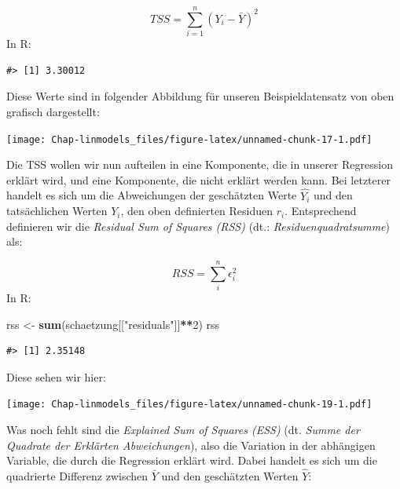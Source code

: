 \documentclass[]{book}
\newenvironment{Shaded}{\begin{snugshade}}{\end{snugshade}}
\newcommand{\KeywordTok}[1]{\textcolor[rgb]{0.13,0.29,0.53}{\textbf{#1}}}
\newcommand{\DecValTok}[1]{\textcolor[rgb]{0.00,0.00,0.81}{#1}}
\newcommand{\StringTok}[1]{\textcolor[rgb]{0.31,0.60,0.02}{#1}}
\newcommand{\OperatorTok}[1]{\textcolor[rgb]{0.81,0.36,0.00}{\textbf{#1}}}
\newcommand{\NormalTok}[1]{#1}
\begin{document}
\[TSS=\sum_{i=1}^n(Y_i-\bar{Y})^2\] In R:

\begin{Shaded}
\end{Shaded}

\begin{verbatim}
#> [1] 3.30012
\end{verbatim}

Diese Werte sind in folgender Abbildung für unseren Beispieldatensatz
von oben grafisch dargestellt:

\texttt{[image: Chap-linmodels\_files/figure-latex/unnamed-chunk-17-1.pdf]}

Die TSS wollen wir nun aufteilen in eine Komponente, die in unserer
Regression erklärt wird, und eine Komponente, die nicht erklärt werden
kann. Bei letzterer handelt es sich um die Abweichungen der geschätzten
Werte \(\hat{Y_i}\) und den tatsächlichen Werten \(Y_i\), den oben
definierten Residuen \(r_i\). Entsprechend definieren wir die
\emph{Residual Sum of Squares (RSS)} (dt.: \emph{Residuenquadratsumme})
als:

\[RSS=\sum_i^n\epsilon_i^2\] In R:

\begin{Shaded}
\begin{Highlighting}[]
\NormalTok{rss <-}\StringTok{ }\KeywordTok{sum}\NormalTok{(schaetzung[[}\StringTok{"residuals"}\NormalTok{]]}\OperatorTok{**}\DecValTok{2}\NormalTok{)}
\NormalTok{rss}
\end{Highlighting}
\end{Shaded}

\begin{verbatim}
#> [1] 2.35148
\end{verbatim}

Diese sehen wir hier:

\texttt{[image: Chap-linmodels\_files/figure-latex/unnamed-chunk-19-1.pdf]}

Was noch fehlt sind die \emph{Explained Sum of Squares (ESS)} (dt.
\emph{Summe der Quadrate der Erklärten Abweichungen}), also die
Variation in der abhängigen Variable, die durch die Regression erklärt
wird. Dabei handelt es sich um die quadrierte Differenz zwischen
\(\bar{Y}\) und den geschätzten Werten \(\hat{Y}\):
\end{document}
